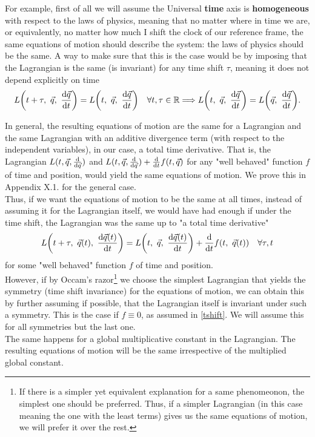 \documentclass[11pt, a4paper]{article} %
\newcommand{\R}{\mathbb{R}} %
\DeclareRobustCommand{\mybox}[2][gray!10]{%
\begin{tcolorbox}[   %
        left=0.2cm,
        right=0.2cm,
        top=0.15cm,
        bottom=0.15cm,
        colback=#1,
        colframe=#1,
        width=\dimexpr\textwidth\relax, 
        enlarge left by=0mm,
        boxsep=5pt,
        arc=0pt,outer arc=0pt,
        ]
        #2
\end{tcolorbox}
}
\begin{document}
For example, first of all we will assume the Universal {\bf time} axis is {\bf homogeneous} with respect to the laws of physics, meaning that no matter where in time we are, or equivalently, no matter how much I shift the clock of our reference frame, the same equations of motion should describe the system: the laws of physics should be the same. A way to make sure that this is the case would be by imposing that the Lagrangian is the same (is invariant) for any time shift $\tau$, meaning it does not depend explicitly on time
\begin{equation}\label{tshift}
L\qty(t+\tau,\ \vec{q},\ \dv{\vec{q}}{t})=L\qty(t,\ \vec{q},\ \dv{\vec{q}}{t})\quad \forall t,\tau\in \R \Longrightarrow L\qty(t,\ \vec{q},\ \dv{\vec{q}}{t})=L\qty(\vec{q},\ \dv{\vec{q}}{t}).
\end{equation}
\mybox{
In general, the resulting equations of motion are the same for a Lagrangian and the same Lagrangian with an additive divergence term (with respect to the independent variables), in our case, a total time derivative. That is, the Lagrangian $L(t, \vec{q}, \dv{\vec{q}})$ and $L(t, \vec{q}, \dv{\vec{q}})+\dv{}{t}f(t,\vec{q})$ for any "well behaved" function $f$ of time and position, would yield the same equations of motion. We prove this in Appendix X.1. for the general case.\\

Thus, if we want the equations of motion to be the same at all times, instead of assuming it for the Lagrangian itself, we would have had enough if under the time shift, the Lagrangian was the same up to "a total time derivative"
\begin{equation}
L\qty(t+\tau,\ \vec{q}(t),\  \dv{\vec{q}(t)}{t})=L\qty(t,\  \vec{q},\  \dv{\vec{q}(t)}{t})+\dv{}{t}f(t,\ \vec{q}(t))\quad \forall \tau,t
\end{equation}
for some "well behaved" function $f$ of time and position.\\

However, if by Occam's razor\footnote{If there is a simpler yet equivalent explanation for a same phenomeonon, the simplest one should be preferred. Thus, if a simpler Lagrangian (in this case meaning the one with the least terms) gives us the same equations of motion, we will prefer it over the rest.} we choose the simplest Lagrangian that yields the symmetry (time shift invariance) for the equations of motion, we can obtain this by further assuming if possible, that the Lagrangian itself is invariant under such a symmetry. This is the case if $f\equiv0$, as assumed in \eqref{tshift}. We will assume this for all symmetries but the last one.\\

The same happens for a global multiplicative constant in the Lagrangian. The resulting equations of motion will be the same irrespective of the multiplied global constant.


}
\end{document}

